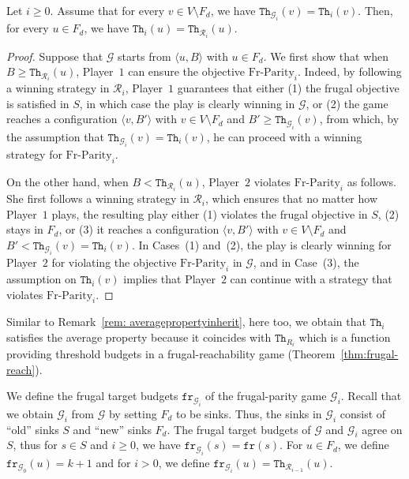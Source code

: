 \documentclass{theoretics}
\newcommand{\PO}{Player~$1$\xspace}
\newcommand{\PT}{Player~$2$\xspace}
\newcommand{\G}{{\mathcal G}}
\newcommand{\R}{{\mathcal R}}
\newcommand{\fr}{\texttt{fr}}
\newcommand{\notFd}{V \setminus F_d}
\newcommand{\thresh}{\texttt{Th}\xspace}
\newcommand{\frparity}{\text{Fr-Parity}}
\newcommand{\zug}[1]{\langle #1  \rangle}
\begin{document}



\begin{lemma}
\label{lem:parity-FrReach}
Let $i \geq 0$. Assume that for every $v \in V \setminus F_d$, we have $\thresh_{\G_i}(v) = \thresh_i(v)$. Then, for every $u \in F_d$, we have $\thresh_i(u) = \thresh_{\R_i}(u)$. 
\end{lemma}
\begin{proof}
Suppose that $\G$ starts from $\zug{u, B}$ with $u \in F_d$. We first show that when $B \geq \thresh_{\R_i}(u)$, \PO can ensure the objective $\frparity_i$. Indeed, by following a winning strategy in $\R_i$, \PO guarantees that either (1) the frugal objective is satisfied in $S$, in which case the play is clearly winning in $\G$, or (2) the game reaches a configuration $\zug{v, B'}$ with $v \in \notFd$ and $B' \geq \thresh_{\G_i}(v)$, from which, by the assumption that $\thresh_{\G_i}(v) = \thresh_i(v)$, he can proceed with a winning strategy for $\frparity_{i}$. 

On the other hand, when $B < \thresh_{\R_i}(u)$, \PT violates $\frparity_i$ as follows. She first follows a winning strategy in $\R_i$, which ensures that no matter how \PO plays, the resulting play either (1) violates the frugal objective in $S$, (2) stays in $F_d$, or (3) it reaches a configuration $\zug{v, B'}$ with $v \in \notFd$ and $B' < \thresh_{\G_i}(v) = \thresh_i(v)$. In Cases~(1) and~(2), the play is clearly winning for \PT for violating the objective \(\frparity_{i}\) in \(\G\), and in Case~(3), the assumption on $\thresh_i(v)$ implies that \PT can continue with a strategy that violates $\frparity_{i}$.
\end{proof}

\begin{remark}
	Similar to Remark~\ref{rem: averagepropertyinherit}, here too, we obtain that \(\thresh_i\) satisfies the average property because it coincides with \(\thresh_{R_i}\) which is a function providing threshold budgets in a frugal-reachability game (Theorem~\ref{thm:frugal-reach}).   
\end{remark}


We define the frugal target budgets $\fr_{\G_i}$ of the frugal-parity game $\G_i$. Recall that we obtain $\G_i$ from $\G$ by setting $F_d$ to be sinks. Thus, the sinks in $\G_i$ consist of ``old'' sinks $S$ and ``new'' sinks $F_d$. The frugal target budgets of $\G$ and $\G_i$ agree on $S$, thus for $s \in S$ and $i \geq 0$, we have $\fr_{\G_i}(s) = \fr(s)$. For $u \in F_d$, we define $\fr_{\G_0}(u) = k+1$ and for $i > 0$, we define $\fr_{\G_i}(u) = \thresh_{\R_{i-1}}(u)$. 
\end{document}
